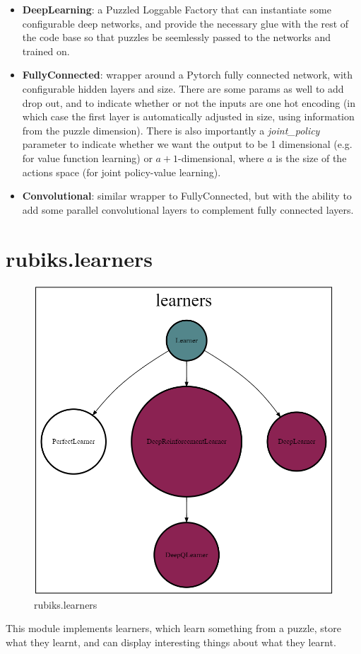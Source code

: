 \begin{itemize}
\item \textbf{DeepLearning}: a Puzzled Loggable Factory that can instantiate some configurable deep networks, and provide the necessary glue with the rest of the code base so that puzzles be seemlessly passed to the networks and trained on. 
\item \textbf{FullyConnected}: wrapper around a Pytorch fully connected network, with configurable hidden layers and size. There are some params as well to add drop out, and to indicate whether or not the inputs are one hot encoding (in which case the first layer is automatically adjusted in size, using information from the puzzle dimension). There is also importantly a \textit{joint\_policy} parameter to indicate whether we want the output to be 1 dimensional (e.g. for value function learning) or $a+1$-dimensional, where $a$ is the size of the actions space (for joint policy-value learning).
\item \textbf{Convolutional}: similar wrapper to FullyConnected, but with the ability to add some parallel convolutional layers to complement fully connected layers.
\end{itemize}


\section{rubiks.learners}
\label{sec:codelearners}
\begin{figure}[H]
\centering
\includegraphics[scale=0.25]{./Figures/codebaselearners}
\caption[Codebase]{rubiks.learners}
\label{fig:Codebaselearners}
\end{figure}
\label{PLcode}
\label{DRLcode}
\label{DQLcode}
This module implements learners, which learn something from a puzzle, store what they learnt, and can display interesting things about what they learnt.

